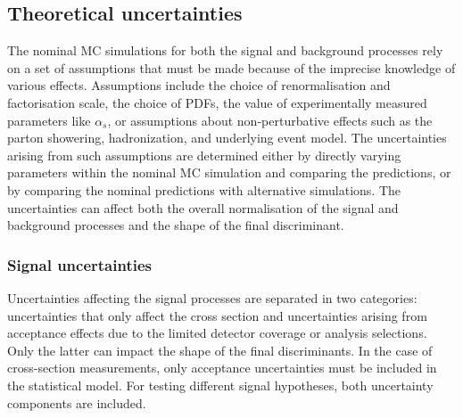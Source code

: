 \subsection{Theoretical uncertainties}
The nominal MC simulations for both the signal and background processes rely on a set of assumptions that must be made because of the imprecise knowledge of various effects. Assumptions include the choice of renormalisation and factorisation scale, the choice of PDFs, the value of experimentally measured parameters like $\alpha_s$, or assumptions about non-perturbative effects such as the parton showering, hadronization, and underlying event model. 
The uncertainties arising from such assumptions are determined either by directly varying parameters within the nominal MC simulation and comparing the predictions, or by comparing the nominal predictions with alternative simulations. 
The uncertainties can affect both the overall normalisation of the signal and background processes and the shape of the final discriminant.  

\subsubsection{Signal uncertainties}
Uncertainties affecting the signal processes are separated in two categories: uncertainties that only affect the cross section and uncertainties arising from acceptance effects due to the limited detector coverage or analysis selections. Only the latter can impact the shape of the final discriminants. 
In the case of cross-section measurements, only acceptance uncertainties must be included in the statistical model. 
For testing different signal hypotheses, both uncertainty components are included. 

